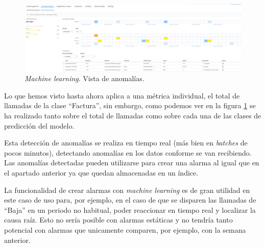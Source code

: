 \begin{figure}[!ht]
	\centering
	\includegraphics[width=1\textwidth]{images/serv/ml-total}
	\caption{\textit{Machine learning}. Vista de anomalías.}
	\label{fig:mlanom}
\end{figure}



Lo que hemos visto hasta ahora aplica a una métrica individual, el total de llamadas de la clase ``Factura'', sin embargo, como podemos ver en la figura \ref{fig:mlanom} se ha realizado tanto sobre el total de llamadas como sobre cada una de las clases de predicción del modelo. 

Esta detección de anomalías se realiza en tiempo real (más bien en \textit{batches} de pocos minutos), detectando anomalías en los datos conforme se van recibiendo. Las anomalías detectadas pueden utilizarse para crear una alarma al igual que en el apartado anterior ya que quedan almacenadas en un índice. 


La funcionalidad de crear alarmas con \textit{machine learning} es de gran utilidad en este caso de uso para, por ejemplo, en el caso de que se disparen las llamadas de ``Baja'' en un periodo no habitual, poder reaccionar en tiempo real y localizar la causa raíz. Esto no sería posible con alarmas estáticas y no tendría tanto potencial con alarmas que unicamente comparen, por ejemplo, con la semana anterior.





